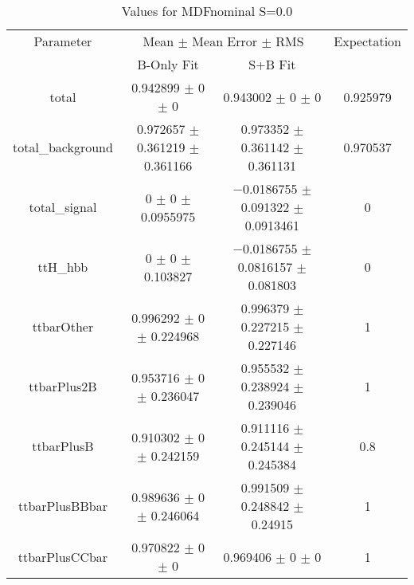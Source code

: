 \begin{table}
\centering
\caption{Values for MDFnominal S=0.0}
\begin{tabular}{cccc}
\toprule
Parameter & \multicolumn{2}{c}{Mean $\pm$ Mean Error $\pm$ RMS} & Expectation\\
 & B-Only Fit & S+B Fit & \\
\midrule
total & \num{0.942899} $\pm$ \num{0} $\pm$ \num{0} & \num{0.943002} $\pm$ \num{0} $\pm$ \num{0} & \num{0.925979}\\
total\_background & \num{0.972657} $\pm$ \num{0.361219} $\pm$ \num{0.361166} & \num{0.973352} $\pm$ \num{0.361142} $\pm$ \num{0.361131} & \num{0.970537}\\
total\_signal & \num{0} $\pm$ \num{0} $\pm$ \num{0.0955975} & \num{-0.0186755} $\pm$ \num{0.091322} $\pm$ \num{0.0913461} & \num{0}\\
ttH\_hbb & \num{0} $\pm$ \num{0} $\pm$ \num{0.103827} & \num{-0.0186755} $\pm$ \num{0.0816157} $\pm$ \num{0.081803} & \num{0}\\
ttbarOther & \num{0.996292} $\pm$ \num{0} $\pm$ \num{0.224968} & \num{0.996379} $\pm$ \num{0.227215} $\pm$ \num{0.227146} & \num{1}\\
ttbarPlus2B & \num{0.953716} $\pm$ \num{0} $\pm$ \num{0.236047} & \num{0.955532} $\pm$ \num{0.238924} $\pm$ \num{0.239046} & \num{1}\\
ttbarPlusB & \num{0.910302} $\pm$ \num{0} $\pm$ \num{0.242159} & \num{0.911116} $\pm$ \num{0.245144} $\pm$ \num{0.245384} & \num{0.8}\\
ttbarPlusBBbar & \num{0.989636} $\pm$ \num{0} $\pm$ \num{0.246064} & \num{0.991509} $\pm$ \num{0.248842} $\pm$ \num{0.24915} & \num{1}\\
ttbarPlusCCbar & \num{0.970822} $\pm$ \num{0} $\pm$ \num{0} & \num{0.969406} $\pm$ \num{0} $\pm$ \num{0} & \num{1}\\
\bottomrule
\end{tabular}
\end{table}